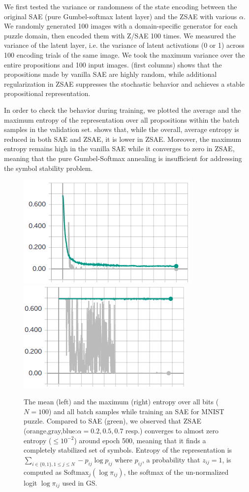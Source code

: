 We first tested the variance or randomness of the state encoding between
the original SAE (pure Gumbel-softmax latent layer) and the ZSAE with various $\alpha$.
We randomly generated 100 images with a domain-specific generator for each puzzle domain,
then encoded them with Z/SAE 100 times.
We measured the variance of the latent layer, i.e. the variance of latent activations (0 or 1)
across 100 encoding trials of the same image.
We took the maximum variance over the entire propositions and 100 input images.
 (first columns) shows that the propositions made by vanilla SAE are highly random,
while additional regularization in ZSAE suppresses the stochastic behavior
and achieves a stable propositional representation.

In order to check the behavior during training, 
we plotted the average and the maximum entropy of the representation over all propositions
within the batch samples in the validation set.
% 
 shows that, while the overall, average entropy is reduced in both SAE and ZSAE,
it is lower in ZSAE. 
Moreover,
the maximum entropy remains high in the vanilla SAE while it converges to zero in ZSAE, meaning that
the pure Gumbel-Softmax annealing is insufficient for addressing the symbol stability problem.

\begin{figure}[htbp]
\centering
 \includegraphics[width=0.49\linewidth]{img/static/val-mean-entropy.png}
 \includegraphics[width=0.49\linewidth]{img/static/val-max-entropy.png}
 \caption{
The mean (left) and the maximum (right) entropy over all bits ($N=100$) and all batch samples
while training an SAE for MNIST puzzle.
Compared to SAE (green), we observed that ZSAE (orange,gray,blue:$\alpha=0.2,0.5,0.7$ resp.) converges to
almost zero entropy ($\leq 10^{-2}$) around epoch 500, meaning that it finds a completely
stabilized set of symbols.
% 
Entropy of the representation is $\sum_{i\in\{0,1\},1\leq j \leq N} -p_{ij}\log p_{ij}$ where
$p_{ij}$, a probability that $z_{ij}=1$, is computed as $\text{Softmax}_j(\log \pi_{ij})$,
the softmax of the un-normalized logit $\log \pi_{ij}$ used in GS.}
\label{ZSAE-entropy}
\end{figure}


